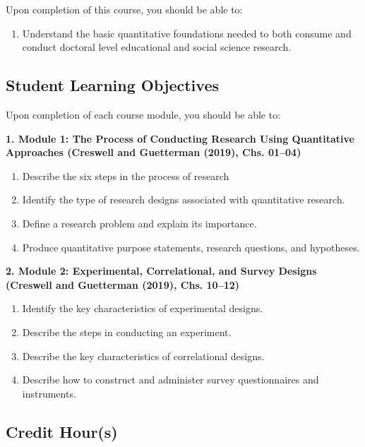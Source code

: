 \documentclass[
]{article}
\providecommand{\tightlist}{%
  \setlength{\itemsep}{0pt}\setlength{\parskip}{0pt}}
\begin{document}
Upon completion of this course, you should be able to:

\begin{enumerate}
\def\labelenumi{\arabic{enumi}.}
\tightlist
\item
  Understand the basic quantitative foundations needed to both consume
  and conduct doctoral level educational and social science research.
\end{enumerate}

\subsection{Student Learning Objectives}

Upon completion of each course module, you should be able to:

\textbf{1. Module 1: The Process of Conducting Research Using
Quantitative Approaches (Creswell and Guetterman (2019), Chs. 01--04)}

\begin{enumerate}
\def\labelenumi{\arabic{enumi}.}
\tightlist
\item
  Describe the six steps in the process of research
\item
  Identify the type of research designs associated with quantitative
  research.
\item
  Define a research problem and explain its importance.
\item
  Produce quantitative purpose statements, research questions, and
  hypotheses.
\end{enumerate}

\textbf{2. Module 2: Experimental, Correlational, and Survey Designs
(Creswell and Guetterman (2019), Chs. 10--12)}

\begin{enumerate}
\def\labelenumi{\arabic{enumi}.}
\tightlist
\item
  Identify the key characteristics of experimental designs.
\item
  Describe the steps in conducting an experiment.
\item
  Describe the key characteristics of correlational designs.
\item
  Describe how to construct and administer survey questionnaires and
  instruments.
\end{enumerate}

\subsection{Credit Hour(s)}
\end{document}
